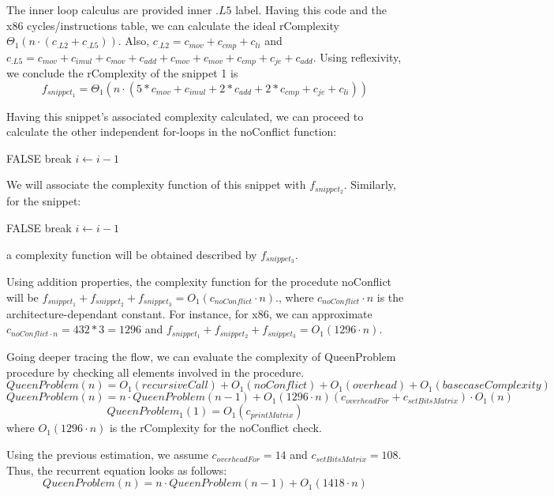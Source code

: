 The inner loop calculus are provided inner $.L5$ label. Having this code and the x86 cycles/instructions table, we can calculate the ideal rComplexity $\Theta_{1}(n \cdot (c_{.L2} + c_{.L5}))$. Also, $c_{.L2} = c_{mov} + c_{cmp} + c_{li}$ and $c_{.L5} = c_{mov} + c_{imul} + c_{mov} +  c_{add} + c_{mov} + c_{mov} + c_{cmp} + c_{je} + c_{add} $. Using reflexivity, we conclude the rComplexity of the snippet 1 is \[f_{snippet_{1}} =  \Theta_{1}(n \cdot ( 5 * c_{mov} + c_{imul} + 2 * c_{add} +2 *  c_{cmp} + c_{je} + c_{li}))\]

Having this snippet's associated complexity calculated, we can proceed to calculate the other independent for-loops in the noConflict function:
\begin{algorithmic}[1]
			\State \Return FALSE
		\EndIf
		\State break
	\EndIf
	\State $i \gets i-1$	
	\EndFor
\end{algorithmic}
We will associate the complexity function of this snippet with $f_{snippet_{2}}$. Similarly, for the snippet:

\begin{algorithmic}[1]
			\State \Return FALSE
		\EndIf
		\State break
	\EndIf
	\State $i \gets i-1$	
	\EndFor
\end{algorithmic}
a complexity function will be obtained described by $f_{snippet_{3}}$.

Using addition properties, the complexity function for the procedute noConflict will be $f_{snippet_{1}} + f_{snippet_{2}} + f_{snippet_{3}} = O_{1}(c_{noConflict} \cdot n)$., where $c_{noConflict} \cdot n$ is the architecture-dependant constant. For instance, for x86, we can approximate $c_{noConflict \cdot n} = 432 * 3 = 1296$ and $f_{snippet_{1}} + f_{snippet_{2}} + f_{snippet_{3}} = O_{1}(1296 \cdot n) $.



Going deeper tracing the flow, we can evaluate the complexity of QueenProblem procedure by checking all elements involved in the procedure.
 \[QueenProblem(n) = O_{1}(recursiveCall) + O_{1}(noConflict) + O_{1}(overhead) + O_{1}(basecaseComplexity) \]
 \[QueenProblem(n) = n \cdot QueenProblem(n-1) +  O_{1}(1296 \cdot n) (c_{overheadFor} + c_{setBitsMatrix}) \cdot O_{1}(n) \]
 \[ QueenProblem_{1}(1)=O_{1}(c_{printMatrix})\]
 where $O_{1}(1296 \cdot n)$ is the rComplexity for the noConflict check.
 
Using the previous estimation, we assume $c_{overheadFor} = 14$ and $c_{setBitsMatrix} = 108$. Thus, the recurrent equation looks as follows: 
\[QueenProblem(n) = n \cdot QueenProblem(n-1) +  O_{1}(1418 \cdot n) \]

